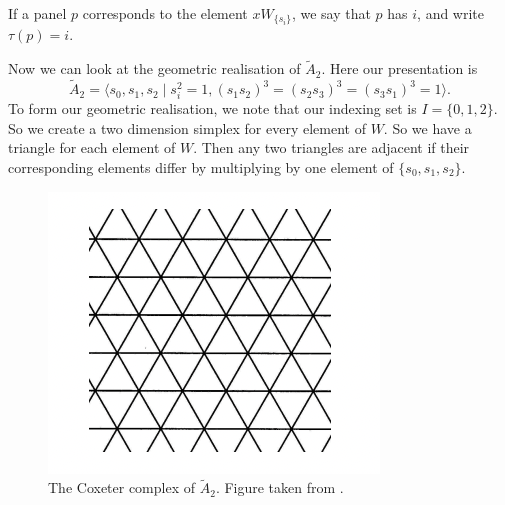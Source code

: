 \documentclass[11pt]{article}
\begin{document}





\begin{definition}
    If a panel $p$ corresponds to the element $xW_{\{s_i\}}$, we say that $p$ has  $i$, and write $\tau(p)=i$. 
\end{definition}




Now we can look at the geometric realisation of $\tilde{A}_2$. Here our presentation is
 \[\tilde{A}_2=\langle s_0,s_1,s_2\mid s_i^2=1, (s_1s_2)^3=(s_2s_3)^3=(s_3s_1)^3=1\rangle.\]
To form our geometric realisation, we note that our indexing set is $I=\{0,1,2\}$. So we create a two dimension simplex for every element of $W$. So we have a triangle for each element of $W$. Then any two triangles are adjacent if their corresponding elements differ by multiplying by one element of $\{s_0,s_1,s_2\}$. 
\begin{figure}[!htbp]
    
    \begin{center}
        \includegraphics[scale=0.9]{Screenshot 2023-04-18 at 17.57.13.png}
    \end{center}
    \caption{The Coxeter complex of $\tilde{A}_2$. Figure taken from \cite[p.9]{COMB}.}
\end{figure}
\end{document}

